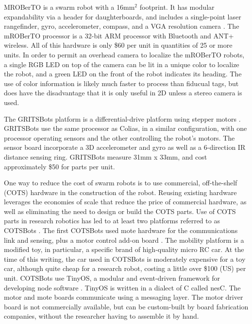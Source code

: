 \documentclass[]{article}
\begin{document}
MROBerTO is a swarm robot with a 16mm$^2$ footprint. It has modular expandability via a header for daughterboards, and includes a single-point laser rangefinder, gyro, accelerometer, compass, and a VGA resolution camera \cite{Kim2016mROBerTOAM}. 
The mROBerTO processor is a 32-bit ARM processor with Bluetooth and ANT+ wireless. 
All of this hardware is only \$60 per unit in quantities of 25 or more units. 
In order to permit an overhead camera to localize the mROBerTO robots, a single RGB LED on top of the camera can be lit in a unique color to localize the robot, and a green LED on the front of the robot indicates its heading. 
The use of color information is likely much faster to process than fiducual tags, but does have the disadvantage that it is only useful in 2D unless a stereo camera is used. 

The GRITSBots platform is a differential-drive platform using stepper motors \cite{pickem2015gritsbot}.
GRITSBots use the same processor as Colias, in a similar configuration, with one processor operating sensors and the other controlling the robot's motors. 
The sensor board incorporate a 3D accelerometer and gyro as well as a 6-direction IR distance sensing ring. 
GRITSBots measure 31mm x 33mm, and cost approximately \$50 for parts per unit. 

One way to reduce the cost of swarm robots is to use commercial, off-the-shelf (COTS) hardware in the construction of the robot. 
Reusing existing hardware leverages the economies of scale that reduce the price of commercial hardware, as well as eliminating the need to design or build the COTS parts. 
Use of COTS parts in research robotics has led to at least two platforms referred to as COTSBots \cite{bergbreiter2003cotsbots, soule2011cotsbots}.
The first COTSBots used mote hardware for the communications link and sensing, plus a motor control add-on board \cite{bergbreiter2003cotsbots}. 
The mobility platform is a modified toy, in particular, a specific brand of high-quality micro RC car.
At the time of this writing, the car used in COTSBots is moderately expensive for a toy car, although quite cheap for a research robot, costing a little over \$100 (US) per unit. 
COTSBots use TinyOS, a modular and event-driven framework for developing node software \cite{levis2005tinyos}. 
TinyOS is written in a dialect of C called nesC. The motor and mote boards communicate using a messaging layer. 
The motor driver board is not commercially available, but can be custom-built by board fabrication companies, without the researcher having to assemble it by hand. 
\end{document}

